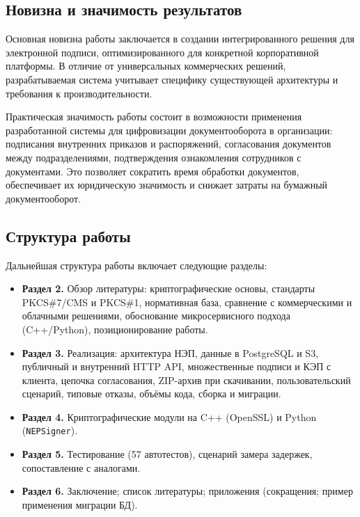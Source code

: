 \documentclass[a4paper,12pt]{extarticle}
\begin{document}
\subsection{Новизна и значимость результатов}

Основная новизна работы заключается в создании интегрированного решения для электронной подписи, оптимизированного для конкретной корпоративной платформы. В отличие от универсальных коммерческих решений, разрабатываемая система учитывает специфику существующей архитектуры и требования к производительности.

Практическая значимость работы состоит в возможности применения разработанной системы для цифровизации документооборота в организации: подписания внутренних приказов и распоряжений, согласования документов между подразделениями, подтверждения ознакомления сотрудников с документами. Это позволяет сократить время обработки документов, обеспечивает их юридическую значимость и снижает затраты на бумажный документооборот.

\subsection{Структура работы}

Дальнейшая структура работы включает следующие разделы:

\begin{itemize}
    \item \textbf{Раздел 2.} Обзор литературы: криптографические основы, стандарты PKCS\#7/CMS и PKCS\#1, нормативная база, сравнение с коммерческими и облачными решениями, обоснование микросервисного подхода (C++/Python), позиционирование работы.

    \item \textbf{Раздел 3.} Реализация: архитектура НЭП, данные в PostgreSQL и S3, публичный и внутренний HTTP API, множественные подписи и КЭП с клиента, цепочка согласования, ZIP-архив при скачивании, пользовательский сценарий, типовые отказы, объёмы кода, сборка и миграции.

    \item \textbf{Раздел 4.} Криптографические модули на C++ (OpenSSL) и Python (\texttt{NEPSigner}).

    \item \textbf{Раздел 5.} Тестирование (57 автотестов), сценарий замера задержек, сопоставление с аналогами.

    \item \textbf{Раздел 6.} Заключение; список литературы; приложения (сокращения; пример применения миграции БД).
\end{itemize}
\end{document}
